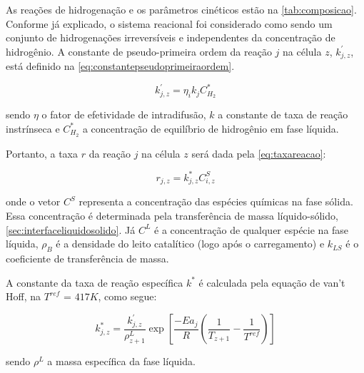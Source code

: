 As reações de hidrogenação e os parâmetros cinéticos estão na
\autoref{tab:composicao}. Conforme já explicado, o sistema reacional foi
considerado como sendo um conjunto de hidrogenações irreversíveis e
independentes da concentração de hidrogênio. A constante de pseudo-primeira
ordem da reação $j$ na célula $z$, $k^{'}_{j,z}$, está definido na
\autoref{eq:constantepseudoprimeiraordem}.

\begin{equation}
k^{'}_{j,z} = \eta_ik_jC^{*}_{H_2}
\label{eq:constantepseudoprimeiraordem}
\end{equation}

sendo $\eta$ o fator de efetividade de intradifusão, $k$ a
constante de taxa de reação instrínseca e $C^{*}_{H_2}$ a concentração de
equilíbrio de hidrogênio em fase líquida.


Portanto, a taxa $r$ da reação $j$ na célula $z$ será dada pela
\autoref{eq:taxareacao}:

\begin{equation}
r_{j,z} = k^{*}_{j,z}C^{S}_{i,z}
\label{eq:taxareacao}
\end{equation}

onde o vetor $C^{S}$ representa a concentração das espécies químicas na fase
sólida. Essa concentração é determinada pela transferência de massa
líquido-sólido, \autoref{sec:interfaceliquidosolido}. Já $C^{L}$ é a
concentração de qualquer espécie na fase líquida, $\rho_B$ é a densidade do
leito catalítico (logo após o carregamento) e $k_{LS}$ é o coeficiente de
transferência de massa.

A constante da taxa de reação específica $k^{*}$ é calculada pela
equação de van't Hoff, na $T^{ref}$ = $417 K$, como segue:

\begin{equation}
k^{*}_{j,z} = \dfrac{k^{'}_{j,z}} {\rho^{L}_{z+1}} \exp
\left[{\dfrac{-Ea_j}{R} \left (\dfrac{1}{T_{z+1}} -
\dfrac{1}{T^{ref}} \right )}\right]
\label{eq:constantetaxareacaoespecifica}
\end{equation}

sendo $\rho^L$ a massa específica da fase líquida.

